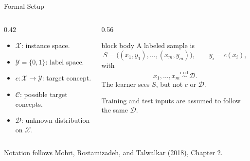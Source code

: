 \documentclass[aspectratio=169,10pt]{beamer}
\newcommand{\X}{\mathcal{X}}
\newcommand{\Y}{\mathcal{Y}}
\newcommand{\D}{\mathcal{D}}
\newcommand{\C}{\mathcal{C}}
\newcommand{\SourceNote}[1]{%
  \vfill
  \begin{flushright}
    {\scriptsize\color{midgray}#1}
  \end{flushright}
}
\begin{document}
\begin{frame}[t]{Formal Setup}
  \vspace{0.02cm}
  \begin{columns}[T,totalwidth=\textwidth]
    \begin{column}{0.42\textwidth}
      \begin{itemize}
        \setlength{\itemsep}{0.20cm}
        \item $\X$: instance space.
        \item $\Y=\{0,1\}$: label space.
        \item $c:\X\to\Y$: target concept.
        \item $\C$: possible target concepts.
        \item $\D$: unknown distribution on $\X$.
      \end{itemize}
    \end{column}
    \begin{column}{0.56\textwidth}
      \begin{beamercolorbox}[rounded=true,sep=0.20cm,wd=\linewidth]{block body}
        A labeled sample is
        \[
          S=\bigl((x_1,y_1),\ldots,(x_m,y_m)\bigr),
          \qquad y_i=c(x_i),
        \]
        with
        \[
          x_1,\ldots,x_m\overset{\mathrm{i.i.d.}}{\sim}\D.
        \]
        The learner sees $S$, but not $c$ or $\D$.
      \end{beamercolorbox}
      \vspace{0.18cm}
      Training and test inputs are assumed to follow the same $\D$.
    \end{column}
  \end{columns}
  \SourceNote{Notation follows Mohri, Rostamizadeh, and Talwalkar (2018), Chapter 2.}
\end{frame}
\end{document}
